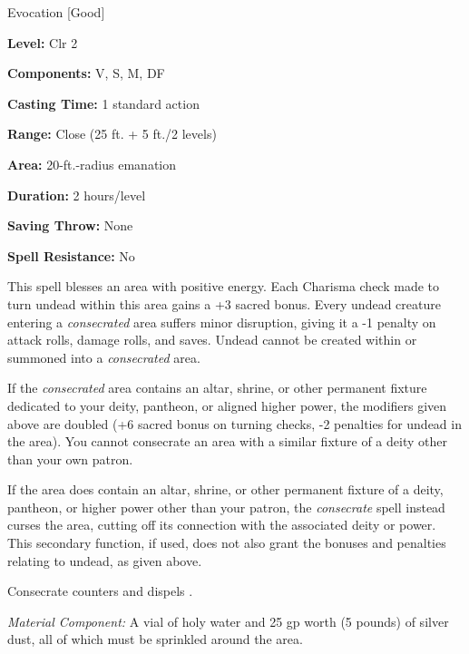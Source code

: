 
Evocation [Good]

\textbf{Level:} Clr 2

\textbf{Components:} V, S, M, DF

\textbf{Casting Time:} 1 standard action

\textbf{Range:} Close (25 ft. + 5 ft./2 levels)

\textbf{Area:} 20-ft.-radius emanation

\textbf{Duration:} 2 hours/level

\textbf{Saving Throw:} None

\textbf{Spell Resistance:} No

This spell blesses an area with positive energy. Each Charisma check made to turn 
undead within this area gains a +3 sacred bonus. Every undead creature entering 
a \textit{consecrated} area suffers minor disruption, giving it a -1 penalty on 
attack rolls, damage rolls, and saves. Undead cannot be created within or summoned 
into a \textit{consecrated} area.

If the \textit{consecrated} area contains an altar, shrine, or other permanent 
fixture dedicated to your deity, pantheon, or aligned higher power, the modifiers 
given above are doubled (+6 sacred bonus on turning checks, -2 penalties for undead 
in the area). You cannot consecrate an area with a similar fixture of a deity other 
than your own patron.

If the area does contain an altar, shrine, or other permanent fixture of a deity, 
pantheon, or higher power other than your patron, the \textit{consecrate} spell 
instead curses the area, cutting off its connection with the associated deity or 
power. This secondary function, if used, does not also grant the bonuses and penalties 
relating to undead, as given above.

Consecrate counters and dispels .

\textit{Material Component:} A vial of holy water and 25 gp worth (5 pounds) of 
silver dust, all of which must be sprinkled around the area.

